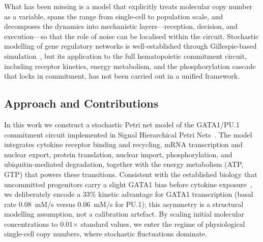What has been missing is a model that explicitly treats molecular copy number as a variable, spans the range from single-cell to population scale, and decomposes the dynamics into mechanistic layers---reception, decision, and execution---so that the role of noise can be localised within the circuit. Stochastic modelling of gene regulatory networks is well-established through Gillespie-based simulation~\cite{gillespie1977}, but its application to the full hematopoietic commitment circuit, including receptor kinetics, energy metabolism, and the phosphorylation cascade that locks in commitment, has not been carried out in a unified framework.

\subsection{Approach and Contributions}

In this work we construct a stochastic Petri net model of the GATA1/PU.1 commitment circuit implemented in Signal Hierarchical Petri Nets~\cite{shypn2026}. The model integrates cytokine receptor binding and recycling, mRNA transcription and nuclear export, protein translation, nuclear import, phosphorylation, and ubiquitin-mediated degradation, together with the energy metabolism (ATP, GTP) that powers these transitions. Consistent with the established biology that uncommitted progenitors carry a slight GATA1 bias before cytokine exposure~\cite{cantor2002}, we deliberately encode a 33\% kinetic advantage for GATA1 transcription (basal rate 0.08~mM/s versus 0.06~mM/s for PU.1); this asymmetry is a structural modelling assumption, not a calibration artefact. By scaling initial molecular concentrations to 0.01$\times$ standard values, we enter the regime of physiological single-cell copy numbers, where stochastic fluctuations dominate.

